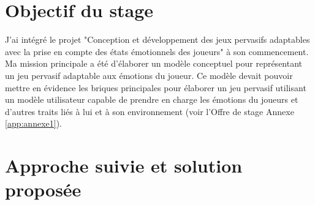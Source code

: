 \documentclass{article}
\begin{document}
\section{Objectif du stage}
	J'ai intégré le projet "Conception et développement des jeux pervasifs adaptables avec la prise en compte des états émotionnels des joueurs" à son commencement. Ma mission principale a été d'élaborer un modèle conceptuel pour représentant un jeu pervasif adaptable aux émotions du joueur.
	Ce modèle devait pouvoir mettre en évidence les briques principales pour élaborer un jeu pervasif utilisant un modèle utilisateur capable de prendre en charge les émotions du joueurs et d'autres traits liés à lui et à son environnement (voir l'Offre de stage Annexe \ref{app:annexe1}).

\section{Approche suivie et solution proposée}
\end{document}
